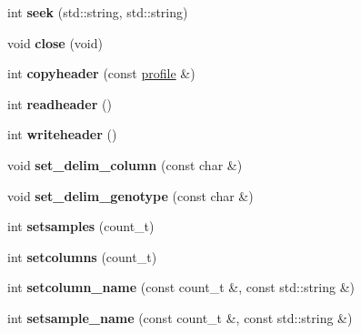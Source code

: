 \begin{DoxyCompactItemize}
\item 
\hypertarget{classmapfile_a5a399393dcc0e56cf932073ead8c23cd}{int {\bfseries seek} (std\-::string, std\-::string)}\label{classmapfile_a5a399393dcc0e56cf932073ead8c23cd}

\item 
\hypertarget{classmapfile_a11b7b9574f8079cbc05ca3dd83260e98}{void {\bfseries close} (void)}\label{classmapfile_a11b7b9574f8079cbc05ca3dd83260e98}

\item 
\hypertarget{classmapfile_ac6a8f3a55e9563239b72f40ea03df20d}{int {\bfseries copyheader} (const \hyperlink{classprofile}{profile} \&)}\label{classmapfile_ac6a8f3a55e9563239b72f40ea03df20d}

\item 
\hypertarget{classmapfile_a85cac050caafb9a4c6cbd2b3a1e622ca}{int {\bfseries readheader} ()}\label{classmapfile_a85cac050caafb9a4c6cbd2b3a1e622ca}

\item 
\hypertarget{classmapfile_ac6c8fae8f80995235af8e71b5e68a29b}{int {\bfseries writeheader} ()}\label{classmapfile_ac6c8fae8f80995235af8e71b5e68a29b}

\item 
\hypertarget{classmapfile_a3f7936422a2f01f4a2922964f1465c28}{void {\bfseries set\-\_\-delim\-\_\-column} (const char \&)}\label{classmapfile_a3f7936422a2f01f4a2922964f1465c28}

\item 
\hypertarget{classmapfile_a23175d397c11a6e8ec6fd72789af77c9}{void {\bfseries set\-\_\-delim\-\_\-genotype} (const char \&)}\label{classmapfile_a23175d397c11a6e8ec6fd72789af77c9}

\item 
\hypertarget{classmapfile_aced88586f8a3c9c3a6cc41f0df43ba3d}{int {\bfseries setsamples} (count\-\_\-t)}\label{classmapfile_aced88586f8a3c9c3a6cc41f0df43ba3d}

\item 
\hypertarget{classmapfile_a3e9d9900bd0556bb5add62d9373e84fe}{int {\bfseries setcolumns} (count\-\_\-t)}\label{classmapfile_a3e9d9900bd0556bb5add62d9373e84fe}

\item 
\hypertarget{classmapfile_a315e3eb9c7dfc714109933b8741c263f}{int {\bfseries setcolumn\-\_\-name} (const count\-\_\-t \&, const std\-::string \&)}\label{classmapfile_a315e3eb9c7dfc714109933b8741c263f}

\item 
\hypertarget{classmapfile_a40722779f6657823beae14704cb787d5}{int {\bfseries setsample\-\_\-name} (const count\-\_\-t \&, const std\-::string \&)}\label{classmapfile_a40722779f6657823beae14704cb787d5}


\end{DoxyCompactItemize}
